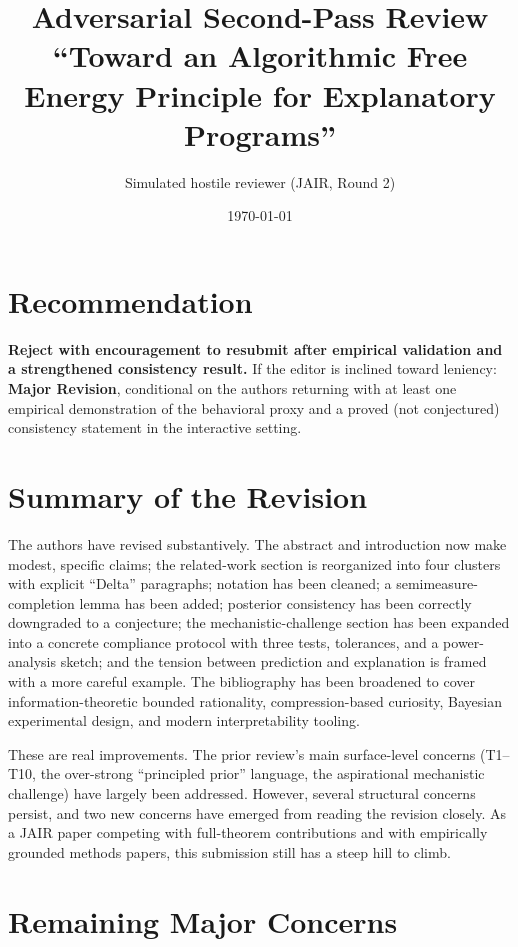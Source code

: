 \documentclass[11pt]{article}
\title{Adversarial Second-Pass Review \\
\large ``Toward an Algorithmic Free Energy Principle for Explanatory Programs''}
\author{Simulated hostile reviewer (JAIR, Round 2)}
\date{\today}
\begin{document}
\maketitle

\section*{Recommendation}

\textbf{Reject with encouragement to resubmit after empirical validation and a strengthened consistency result.} If the editor is inclined toward leniency: \textbf{Major Revision}, conditional on the authors returning with at least one empirical demonstration of the behavioral proxy and a proved (not conjectured) consistency statement in the interactive setting.

\section*{Summary of the Revision}

The authors have revised substantively. The abstract and introduction now make modest, specific claims; the related-work section is reorganized into four clusters with explicit ``Delta'' paragraphs; notation has been cleaned; a semimeasure-completion lemma has been added; posterior consistency has been correctly downgraded to a conjecture; the mechanistic-challenge section has been expanded into a concrete compliance protocol with three tests, tolerances, and a power-analysis sketch; and the tension between prediction and explanation is framed with a more careful example. The bibliography has been broadened to cover information-theoretic bounded rationality, compression-based curiosity, Bayesian experimental design, and modern interpretability tooling.

These are real improvements. The prior review's main surface-level concerns (T1--T10, the over-strong ``principled prior'' language, the aspirational mechanistic challenge) have largely been addressed. However, several structural concerns persist, and two new concerns have emerged from reading the revision closely. As a JAIR paper competing with full-theorem contributions and with empirically grounded methods papers, this submission still has a steep hill to climb.

\section*{Remaining Major Concerns}
\end{document}
